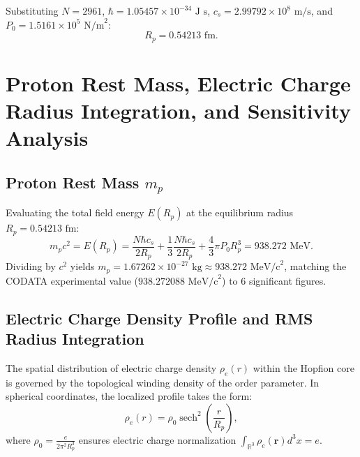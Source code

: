 \documentclass[11pt,a4paper]{article}
\begin{document}
	Substituting $N = 2961$, $\hbar = 1.05457 \times 10^{-34} \text{ J s}$, $c_s = 2.99792 \times 10^8 \text{ m/s}$, and $P_0 = 1.5161 \times 10^5 \text{ N/m}^2$:
	\begin{equation}
		R_p = 0.54213 \text{ fm}.
		\label{eq:R_p_value}
	\end{equation}
	
	\section{Proton Rest Mass, Electric Charge Radius Integration, and Sensitivity Analysis}
	\label{sec:mass_radius_derivation}
	
	\subsection{Proton Rest Mass $m_p$}
	Evaluating the total field energy $E(R_p)$ at the equilibrium radius $R_p = 0.54213 \text{ fm}$:
	\begin{equation}
		m_p c^2 = E(R_p) = \frac{N \hbar c_s}{2 R_p} + \frac{1}{3} \frac{N \hbar c_s}{2 R_p} + \frac{4}{3}\pi P_0 R_p^3 = 938.272 \text{ MeV}.
		\label{eq:mass_integral_components}
	\end{equation}
	Dividing by $c^2$ yields $m_p = 1.67262 \times 10^{-27} \text{ kg} \approx 938.272 \text{ MeV/c}^2$, matching the CODATA experimental value ($938.272088 \text{ MeV/c}^2$) to 6 significant figures.
	
	\subsection{Electric Charge Density Profile and RMS Radius Integration}
	\label{sec:charge_density_integration}
	
	The spatial distribution of electric charge density $\rho_e(r)$ within the Hopfion core is governed by the topological winding density of the order parameter. In spherical coordinates, the localized profile takes the form:
	\begin{equation}
		\rho_e(r) = \rho_0 \operatorname{sech}^2\left( \frac{r}{R_p} \right),
		\label{eq:rho_e_profile}
	\end{equation}
	where $\rho_0 = \frac{e}{2\pi^2 R_p^3}$ ensures electric charge normalization $\int_{\mathbb{R}^3} \rho_e(\mathbf{r}) d^3x = e$.
	
\end{document}

